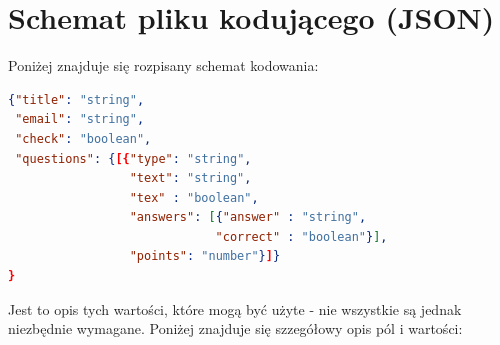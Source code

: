 \section{Schemat pliku kodującego (JSON)}
Poniżej znajduje się rozpisany schemat kodowania: 
\begin{lstlisting}[language=json,firstnumber=1]
{"title": "string",
 "email": "string",
 "check": "boolean",
 "questions": {[{"type": "string", 
                 "text": "string",
                 "tex" : "boolean",
                 "answers": [{"answer" : "string",
                             "correct" : "boolean"}],
                 "points": "number"}]}
}

\end{lstlisting}
Jest to opis tych wartości, które mogą być użyte - nie wszystkie są jednak niezbędnie wymagane. Poniżej znajduje się szzegółowy opis pól i wartości:
